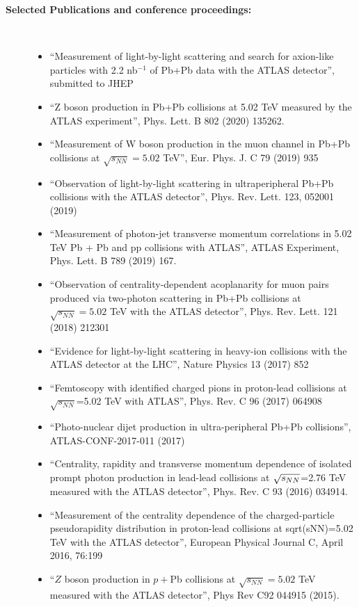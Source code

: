 \documentclass[11 pt]{article}
\begin{document}
\begin{description}

\item[\bf Selected Publications and conference proceedings:]\
\begin{itemize}
\item ``Measurement of light-by-light scattering and search for axion-like particles with 2.2 nb$^{-1}$ of Pb+Pb data with the ATLAS detector'', submitted to JHEP
\item ``Z boson production in Pb+Pb collisions at 5.02 TeV measured by the ATLAS experiment'', Phys. Lett. B 802 (2020) 135262.
\item ``Measurement of W boson production in the muon channel in Pb+Pb collisions at $\sqrt{s_{NN}}=5.02$ TeV'', Eur. Phys. J. C 79 (2019) 935
\item ``Observation of light-by-light scattering in ultraperipheral Pb+Pb collisions with the ATLAS detector'', Phys. Rev. Lett. 123, 052001 (2019)
\item ``Measurement of photon-jet transverse momentum correlations in 5.02 TeV Pb + Pb and pp collisions with ATLAS'', ATLAS Experiment, Phys. Lett. B 789 (2019) 167.
\item ``Observation of centrality-dependent acoplanarity for muon pairs produced via two-photon scattering in Pb+Pb collisions at $\sqrt{s_{NN}}=5.02$ TeV with the ATLAS detector'', Phys. Rev. Lett. 121 (2018) 212301
\item ``Evidence for light-by-light scattering in heavy-ion collisions with the ATLAS detector at the LHC'', Nature Physics 13 (2017) 852
\item ``Femtoscopy with identified charged pions in proton-lead collisions at $\sqrt{s_{NN}}$=5.02 TeV with ATLAS'', Phys. Rev. C 96 (2017) 064908
\item ``Photo-nuclear dijet production in ultra-peripheral Pb+Pb collisions'', ATLAS-CONF-2017-011 (2017)
\item ``Centrality, rapidity and transverse momentum dependence of isolated prompt photon production in lead-lead collisions at $\sqrt{s_{NN}}$=2.76 TeV measured with the ATLAS detector'', Phys. Rev. C 93 (2016) 034914.
\item ``Measurement of the centrality dependence of the charged-particle pseudorapidity distribution in proton-lead collisions at sqrt(sNN)=5.02 TeV with the ATLAS detector'', European Physical Journal C, April 2016, 76:199
\item ``$Z$ boson production in $p+$Pb collisions at $\sqrt{s_{NN}}=5.02$ TeV measured with the ATLAS detector'', Phys Rev C92 044915 (2015).

\end{itemize}
\end{description}
\end{document}
